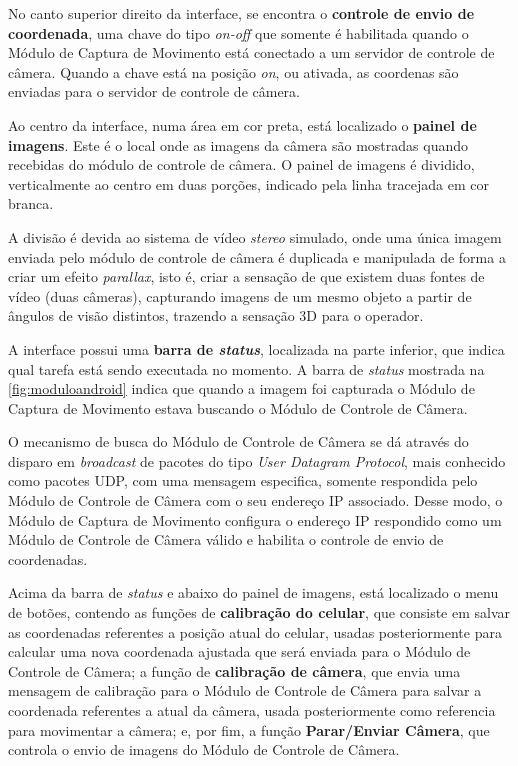 No canto superior direito da interface, se encontra o \textbf{controle de envio de coordenada}, uma chave do tipo \textit{on-off} que somente é habilitada quando o Módulo de Captura de Movimento está conectado a um servidor de controle de câmera. Quando a chave está na posição \textit{on}, ou ativada, as coordenas são enviadas para o servidor de controle de câmera.\par

Ao centro da interface, numa área em cor preta, está localizado o \textbf{painel de imagens}. Este é o local onde as imagens da câmera são mostradas quando recebidas do módulo de controle de câmera. O painel de imagens é dividido, verticalmente ao centro em duas porções, indicado pela linha tracejada em cor branca.\par

A divisão é devida ao sistema de vídeo \textit{stereo} simulado, onde uma única imagem enviada pelo módulo de controle de câmera é duplicada e manipulada de forma a criar um efeito \textit{parallax}, isto é, criar a sensação de que existem duas fontes de vídeo (duas câmeras), capturando imagens de um mesmo objeto a partir de ângulos de visão distintos, trazendo a sensação 3D para o operador.\par

A interface possui uma \textbf{barra de \textit{status}}, localizada na parte inferior, que indica qual tarefa está sendo executada no momento. A barra de \textit{status} mostrada na \autoref{fig:moduloandroid} indica que quando a imagem foi capturada o Módulo de Captura de Movimento estava buscando o Módulo de Controle de Câmera.\par

O mecanismo de busca do Módulo de Controle de Câmera se dá através do disparo em \textit{broadcast} de pacotes do tipo \textit{User Datagram Protocol}, mais conhecido como pacotes UDP, com uma mensagem especifica, somente respondida pelo Módulo de Controle de Câmera com o seu endereço IP associado. Desse modo, o Módulo de Captura de Movimento configura o endereço IP respondido como um Módulo de Controle de Câmera válido e habilita o controle de envio de coordenadas.\par

Acima da barra de \textit{status} e abaixo do painel de imagens, está localizado o menu de botões, contendo as funções de \textbf{calibração do celular}, que consiste em salvar as coordenadas referentes a posição atual do celular, usadas posteriormente para calcular uma nova coordenada ajustada que será enviada para o Módulo de Controle de Câmera; a função de \textbf{calibração de câmera}, que envia uma mensagem de calibração para o Módulo de Controle de Câmera para salvar a coordenada referentes a atual da câmera, usada posteriormente como referencia para movimentar a câmera; e, por fim, a função \textbf{Parar/Enviar Câmera}, que controla o envio de imagens do Módulo de Controle de Câmera.\par

